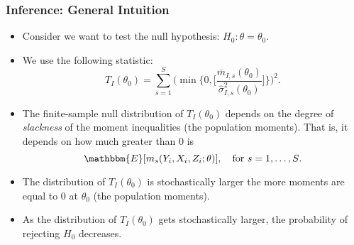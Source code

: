 \begin{frame}
\frametitle{Inference: General Intuition}

\begin{itemize}
	\item Consider we want to test the null hypothesis: $H_{0}: \theta=\theta_{0}$.
	\item We use the following statistic:
	\begin{equation*}
	T_{I}(\theta_{0})=\sum_{s=1}^{S}\Big(\min\{0,\Big[\frac{\overline{m}_{I,s}(\theta_{0})}{\hat{\sigma}^{2}_{I,s}(\theta_{0})}\Big]\}\Big)^{2}.
	\end{equation*}
	\item The finite-sample null distribution of $T_{I}(\theta_{0})$ depends on the degree of \textit{slackness} of the moment inequalities (the population moments). That is, it depends on how much greater than 0 is
	\begin{equation*}
	\mathbbm{E}[m_{s}(Y_{i},X_{i},Z_{i};\theta)],\quad\text{for $s=1,\dots,S$}.
	\end{equation*}
	\item The distribution of $T_{I}(\theta_{0})$ is stochastically larger the more moments are equal to 0 at $\theta_{0}$ (the population moments).
	\item As the distribution of $T_{I}(\theta_{0})$ gets stochastically larger, the probability of rejecting $H_{0}$ decreases.
\end{itemize}
\end{frame}
